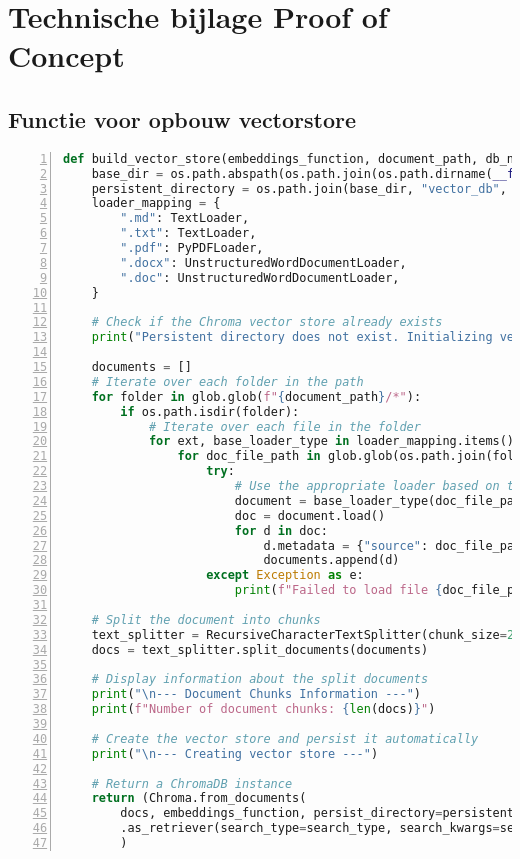 \section{Technische bijlage Proof of Concept}
\label{technische-bijlage}
\subsection{Functie voor opbouw vectorstore}
\label{functie-vectorstore}

\begin{lstlisting}[basicstyle=\small, frame=single, breaklines=true, postbreak=\mbox{\textcolor{red}{$\hookrightarrow$}\space}, escapeinside ={\%,}, escapechar={!},
    numbers=left, language=Python, caption=Aanmaken van de vectorstore]
def build_vector_store(embeddings_function, document_path, db_name, search_type, search_kwargs):
    base_dir = os.path.abspath(os.path.join(os.path.dirname(__file__), "../../resources"))
    persistent_directory = os.path.join(base_dir, "vector_db", db_name)
    loader_mapping = {
        ".md": TextLoader,
        ".txt": TextLoader,
        ".pdf": PyPDFLoader,
        ".docx": UnstructuredWordDocumentLoader,
        ".doc": UnstructuredWordDocumentLoader,
    }
    
    # Check if the Chroma vector store already exists
    print("Persistent directory does not exist. Initializing vector store...")
    
    documents = []
    # Iterate over each folder in the path
    for folder in glob.glob(f"{document_path}/*"):
        if os.path.isdir(folder):
            # Iterate over each file in the folder
            for ext, base_loader_type in loader_mapping.items():
                for doc_file_path in glob.glob(os.path.join(folder, f"*{ext}")):
                    try:
                        # Use the appropriate loader based on the file extension
                        document = base_loader_type(doc_file_path, encoding="utf-8")
                        doc = document.load()
                        for d in doc:
                            d.metadata = {"source": doc_file_path, "folder": folder}
                            documents.append(d)
                    except Exception as e:
                        print(f"Failed to load file {doc_file_path}: {e}")
        
    # Split the document into chunks
    text_splitter = RecursiveCharacterTextSplitter(chunk_size=2000, chunk_overlap=500)
    docs = text_splitter.split_documents(documents)
    
    # Display information about the split documents
    print("\n--- Document Chunks Information ---")
    print(f"Number of document chunks: {len(docs)}")
    
    # Create the vector store and persist it automatically
    print("\n--- Creating vector store ---")
    
    # Return a ChromaDB instance
    return (Chroma.from_documents(
        docs, embeddings_function, persist_directory=persistent_directory)
        .as_retriever(search_type=search_type, search_kwargs=search_kwargs)
        )
\end{lstlisting}


